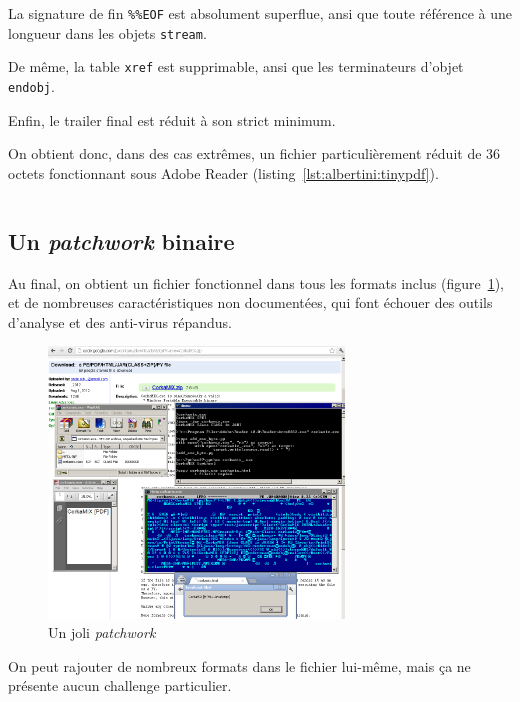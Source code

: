 La signature de fin \texttt{\%\%EOF} est absolument superflue, ansi que toute référence à une longueur dans les objets \texttt{stream}.

De même, la table \texttt{xref} est supprimable, ansi que les terminateurs d'objet \texttt{endobj}.

Enfin, le trailer final est réduit à son strict minimum.

On obtient donc, dans des cas extrêmes, un fichier \PDF particulièrement réduit de 36 octets fonctionnant sous Adobe Reader (listing~\ref{lst:albertini:tinypdf}).

\begin{lstlisting}[language={},caption={Un \PDF valide de 36 octets.},label={lst:albertini:tinypdf}]
%PDF- trailer<</Root<</Pages<<>>>>>>
\end{lstlisting}

\subsection{Un \emph{patchwork} binaire}

Au final, on obtient un fichier fonctionnel dans tous les formats inclus (figure~\ref{fig:albertini:corkamix}), et de nombreuses caractéristiques non documentées, qui font échouer des outils d'analyse et des anti-virus répandus.

\begin{figure}[p]
  \centering
  \includegraphics[width=0.7\textwidth]{albertini/img/corkamix}
  \caption{Un joli \emph{patchwork}}
  \label{fig:albertini:corkamix}
\end{figure}

On peut rajouter de nombreux formats dans le fichier \ZIP lui-même, mais ça ne présente aucun challenge particulier.

